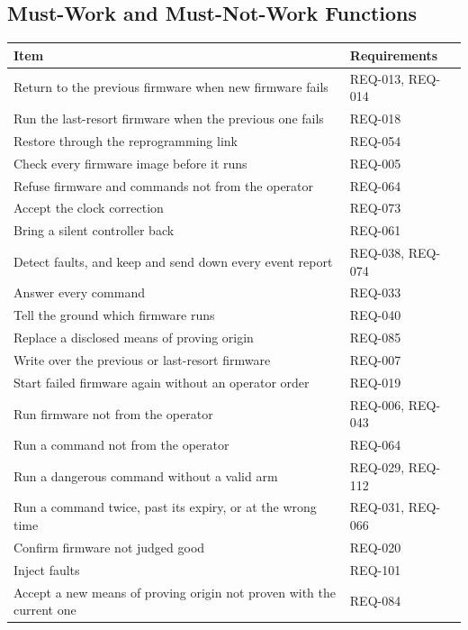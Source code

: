 \documentclass[11pt,a4paper]{article}
\begin{document}
\subsection{Must-Work and Must-Not-Work Functions}
{\footnotesize
\begin{xltabular}{\textwidth}{@{}>{\raggedright\arraybackslash}X>{\raggedright\arraybackslash}p{6.2cm}@{}}
\toprule
Item & Requirements \\
\midrule
\endhead
Return to the previous firmware when new firmware fails & REQ-013, REQ-014 \\
Run the last-resort firmware when the previous one fails & REQ-018 \\
Restore through the reprogramming link & REQ-054 \\
Check every firmware image before it runs & REQ-005 \\
Refuse firmware and commands not from the operator & REQ-064 \\
Accept the clock correction & REQ-073 \\
Bring a silent controller back & REQ-061 \\
Detect faults, and keep and send down every event report & REQ-038, REQ-074 \\
Answer every command & REQ-033 \\
Tell the ground which firmware runs & REQ-040 \\
Replace a disclosed means of proving origin & REQ-085 \\
Write over the previous or last-resort firmware & REQ-007 \\
Start failed firmware again without an operator order & REQ-019 \\
Run firmware not from the operator & REQ-006, REQ-043 \\
Run a command not from the operator & REQ-064 \\
Run a dangerous command without a valid arm & REQ-029, REQ-112 \\
Run a command twice, past its expiry, or at the wrong time & REQ-031, REQ-066 \\
Confirm firmware not judged good & REQ-020 \\
Inject faults & REQ-101 \\
Accept a new means of proving origin not proven with the current one & REQ-084 \\
\bottomrule
\end{xltabular}}
\end{document}
